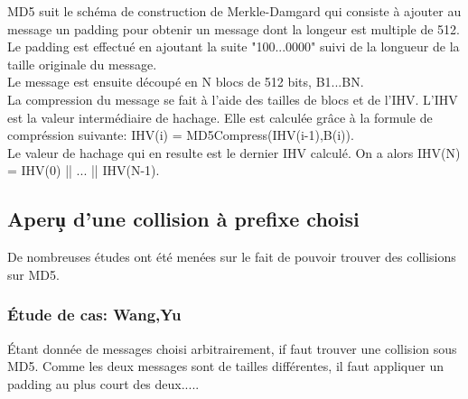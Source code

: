 \documentclass[a4paper,11pt,french]{article}
\begin{document}
MD5 suit le schéma de construction de Merkle-Damgard qui consiste à ajouter au message un padding pour obtenir un message dont la longeur est multiple de 512. Le padding est effectué en ajoutant la suite "100...0000" suivi de la longueur de la taille originale du message.\\

Le message est ensuite découpé en N blocs de 512 bits, B1...BN.\\

La compression du message se fait à l'aide des tailles de blocs et de l'IHV. L'IHV est la valeur intermédiaire de hachage. Elle est calculée grâce à la formule de compréssion suivante: IHV(i) = MD5Compress(IHV(i-1),B(i)).\\

Le valeur de hachage qui en resulte est le dernier IHV calculé. On a alors IHV(N) = IHV(0) || ... || IHV(N-1).\\

\subsection{Aper\c u d'une collision à prefixe choisi}

De nombreuses études ont été menées sur le fait de pouvoir trouver des collisions sur MD5.

\subsubsection{\'Etude de cas: Wang,Yu}
\'Etant donnée de messages choisi arbitrairement, if faut trouver une collision sous MD5. Comme les deux messages sont de tailles différentes, il faut appliquer un padding au plus court des deux.....
\end{document}
